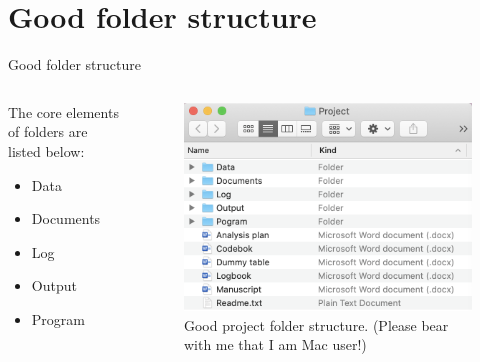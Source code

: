 \documentclass{beamer}
\begin{document}
\section{Good folder structure}
\begin{frame}{Good folder structure}
	\begin{columns}
	\begin{column}{0.5\textwidth}
	The core elements of folders are listed below:
		\begin{itemize}
				\item Data
				\item Documents
				\item Log
				\item Output
				\item Program
		\end{itemize}
	\end{column}
	
	\begin{column}{0.5\textwidth}
	\begin{figure}
			\includegraphics[scale=0.4]{image/structure}
			\caption{Good project folder structure. (Please bear with me that I am Mac user!)}
	\end{figure}
	\end{column}
	\end{columns}

\end{frame}

\end{document}
